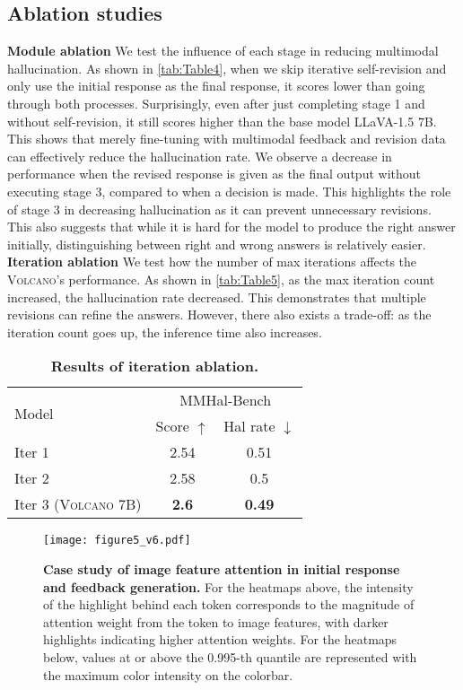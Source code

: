 \documentclass[11pt]{article}
\newcommand{\Ours}{\textsc{Volcano}}
\begin{document}
\subsection{Ablation studies}
\label{subsec:ablation}
\textbf{Module ablation} We test the influence of each stage in reducing multimodal hallucination. As shown in \autoref{tab:Table4}, when we skip iterative self-revision and only use the initial response as the final response, it scores lower than going through both processes. Surprisingly, even after just completing stage 1 and without self-revision, it still scores higher than the base model LLaVA-1.5 7B. This shows that merely fine-tuning with multimodal feedback and revision data can effectively reduce the hallucination rate. We observe a decrease in performance when the revised response is given as the final output without executing stage 3, compared to when a decision is made. This highlights the role of stage 3 in decreasing hallucination as it can prevent unnecessary revisions. This also suggests that while it is hard for the model to produce the right answer initially, distinguishing between right and wrong answers is relatively easier. \\
\noindent \textbf{Iteration ablation} We test how the number of max iterations affects the {\Ours}'s performance. As shown in \autoref{tab:Table5}, as the max iteration count increased, the hallucination rate decreased. This demonstrates that multiple revisions can refine the answers. However, there also exists a trade-off: as the iteration count goes up, the inference time also increases.\\
\begin{table}[t]
\centering
\small
\begin{tabular}{lcc}
\toprule
\multirow{2}{*}{Model} & \multicolumn{2}{c}{MMHal-Bench} \\
& Score $\uparrow$ & Hal rate $\downarrow$  \\
\midrule
Iter 1  & 2.54 & 0.51  \\
Iter 2 & 2.58 & 0.5  \\
Iter 3 ({\Ours} 7B) & \textbf{2.6} & \textbf{0.49} \\
\bottomrule
\end{tabular}
\caption{\textbf{Results of iteration ablation.}}
\label{tab:Table5}
\end{table}
\begin{figure*}[t]
    \centering
    \texttt{[image: figure5\_v6.pdf]}
    \caption{\textbf{Case study of image feature attention in initial response and feedback generation.} For the heatmaps above, the intensity of the highlight behind each token corresponds to the magnitude of attention weight from the token to image features, with darker highlights indicating higher attention weights. For the heatmaps below, values at or above the 0.995-th quantile are represented with the maximum color intensity on the colorbar.}
    \label{fig:figure5}
\end{figure*}
\FloatBarrier
\end{document}
